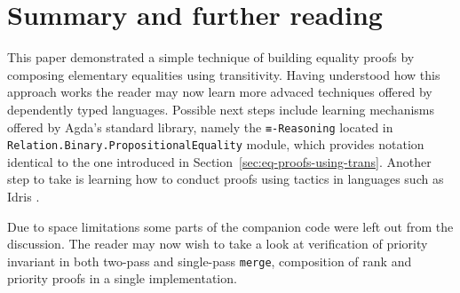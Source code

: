 \section{Summary and further reading}

This paper demonstrated a simple technique of building equality proofs by composing elementary equalities using transitivity. Having understood how this approach works the reader may now learn more advaced techniques offered by dependently typed languages. Possible next steps include learning mechanisms offered by Agda's standard library, namely the \texttt{≡-Reasoning} located in \texttt{Relation.}\texttt{Binary.}\texttt{PropositionalEquality} module, which provides notation identical to the one introduced in Section~\ref{sec:eq-proofs-using-trans}. Another step to take is learning how to conduct proofs using tactics in languages such as Idris \cite{Bra13}.

Due to space limitations some parts of the companion code were left out from the discussion. The reader may now wish to take a look at verification of priority invariant in both two-pass and single-pass \texttt{merge}, composition of rank and priority proofs in a single implementation.
